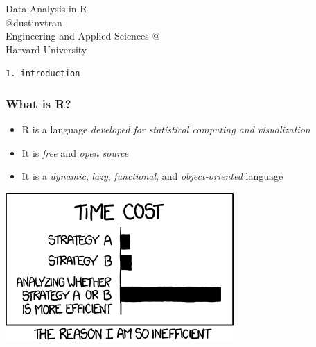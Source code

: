 \documentclass[10pt,c]{beamer}
\title{}
\begin{document}
\begingroup
{}
\begin{frame}[plain,t]
\vspace{4cm}
\hspace{0.5cm}
{\huge Data Analysis in R}\\[2ex]
\hspace{0.5cm}
@dustinvtran\\
\hspace{0.5cm}
Engineering and Applied Sciences @\\
\hspace{0.5cm}
Harvard University\\
\end{frame}
\endgroup
\begin{frame}[plain]
\vspace{1.5cm}
\begin{center}
\Large\texttt{1. introduction}
\end{center}
\end{frame}
\begin{frame}
\frametitle{What is R?}
\begin{itemize}[<+->]
\item R is a language \emph{developed for statistical computing and
visualization}
\item It is \emph{free} and \emph{open source}
\item It is a \emph{dynamic}, \emph{lazy}, \emph{functional}, and
\emph{object-oriented} language
\end{itemize}
\end{frame}
\begingroup
{}
\begin{frame}[plain]
\begin{center}
\includegraphics{img/xkcd_1445.png}
\end{center}
\end{frame}
\end{document}
